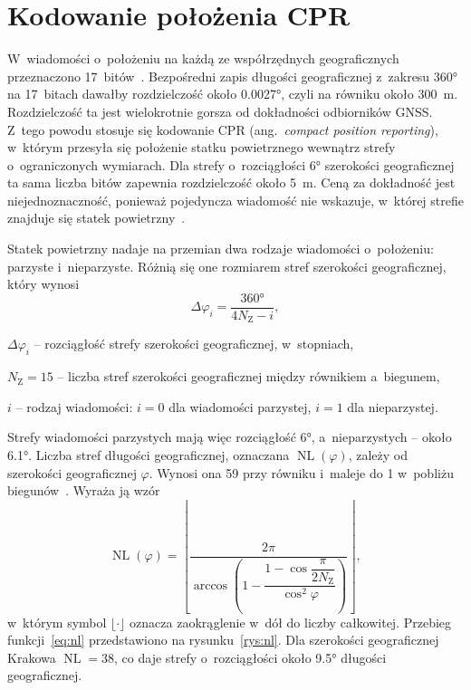 \section{Kodowanie położenia CPR}\label{sec:cpr}


W~wiadomości o~położeniu na każdą ze współrzędnych geograficznych przeznaczono 17~bitów~\cite{sun2021}. Bezpośredni zapis długości geograficznej z~zakresu \ang{360} na 17~bitach dawałby rozdzielczość około \ang{0.0027}, czyli na równiku około \SI{300}{m}. Rozdzielczość ta jest wielokrotnie gorsza od dokładności odbiorników GNSS. Z~tego powodu stosuje się kodowanie CPR (ang.~\textit{compact position reporting}), w~którym przesyła się położenie statku powietrznego wewnątrz strefy o~ograniczonych wymiarach. Dla strefy o~rozciągłości \ang{6} szerokości geograficznej ta sama liczba bitów zapewnia rozdzielczość około \SI{5}{m}. Ceną za dokładność jest niejednoznaczność, ponieważ pojedyncza wiadomość nie wskazuje, w~której strefie znajduje się statek powietrzny~\cite{sun2021}.

Statek powietrzny nadaje na przemian dwa rodzaje wiadomości o~położeniu: parzyste i~nieparzyste. Różnią się one rozmiarem stref szerokości geograficznej, który wynosi~\cite{sun2021}
\begin{equation}
  \Delta\varphi_i = \frac{\ang{360}}{4N_{\mathrm{Z}} - i},
  \label{eq:dlat}
\end{equation}
\begin{gdzie}
  \item $\Delta\varphi_i$ -- rozciągłość strefy szerokości geograficznej, w~stopniach,
  \item $N_{\mathrm{Z}} = 15$ -- liczba stref szerokości geograficznej między równikiem a~biegunem,
  \item $i$ -- rodzaj wiadomości: $i = 0$ dla wiadomości parzystej, $i = 1$ dla nieparzystej.
\end{gdzie}
Strefy wiadomości parzystych mają więc rozciągłość \ang{6}, a~nieparzystych -- około \ang{6.1}. Liczba stref długości geograficznej, oznaczana $\operatorname{NL}(\varphi)$, zależy od szerokości geograficznej $\varphi$. Wynosi ona 59 przy równiku i~maleje do 1 w~pobliżu biegunów~\cite{sun2021}.
Wyraża ją wzór~\cite{sun2021}
\begin{equation}
  \operatorname{NL}(\varphi) = \left\lfloor
    \frac{2\pi}{\arccos\left(1 - \dfrac{1 - \cos\dfrac{\pi}{2N_{\mathrm{Z}}}}{\cos^{2}\varphi}\right)}
  \right\rfloor,
  \label{eq:nl}
\end{equation}
w~którym symbol $\lfloor\cdot\rfloor$ oznacza zaokrąglenie w~dół do liczby całkowitej. Przebieg funkcji~\eqref{eq:nl} przedstawiono na rysunku~\ref{rys:nl}. Dla szerokości geograficznej Krakowa $\operatorname{NL} = 38$, co daje strefy o~rozciągłości około \ang{9.5} długości geograficznej.


